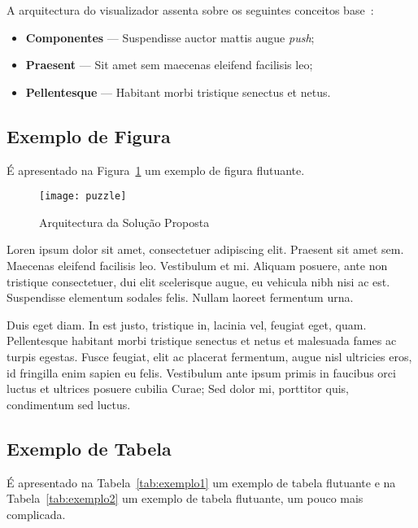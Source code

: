 A arquitectura do visualizador assenta sobre os seguintes conceitos
base~\citep{kn:ZPMD97}: 

\begin{itemize}
\item \textbf{Componentes} --- Suspendisse auctor mattis augue \emph{push};
\item \textbf{Praesent} --- Sit amet sem maecenas eleifend facilisis leo;
\item \textbf{Pellentesque} --- Habitant morbi tristique senectus et netus.
\end{itemize}

\subsection{Exemplo de Figura}

É apresentado na Figura~\ref{fig:arch} %
um exemplo de figura flutuante.

\begin{figure}[t]
  \begin{center}
    \leavevmode
    \texttt{[image: puzzle]}
    \caption{Arquitectura da Solução Proposta}
    \label{fig:arch}
  \end{center}
\end{figure}

Loren ipsum dolor sit amet, consectetuer adipiscing elit. 
Praesent sit amet sem. Maecenas eleifend facilisis leo. Vestibulum et
mi. Aliquam posuere, ante non tristique consectetuer, dui elit
scelerisque augue, eu vehicula nibh nisi ac est. Suspendisse elementum
sodales felis. Nullam laoreet fermentum urna. 

Duis eget diam. In est justo, tristique in, lacinia vel, feugiat eget,
quam. Pellentesque habitant morbi tristique senectus et netus et
malesuada fames ac turpis egestas. Fusce feugiat, elit ac placerat
fermentum, augue nisl ultricies eros, id fringilla enim sapien eu
felis. Vestibulum ante ipsum primis in faucibus orci luctus et
ultrices posuere cubilia Curae; Sed dolor mi, porttitor quis,
condimentum sed luctus. 

\subsection{Exemplo de Tabela}

É apresentado na Tabela~\ref{tab:exemplo1} um exemplo de tabela
flutuante e na Tabela~\ref{tab:exemplo2} um exemplo de tabela
flutuante, um pouco mais complicada.

